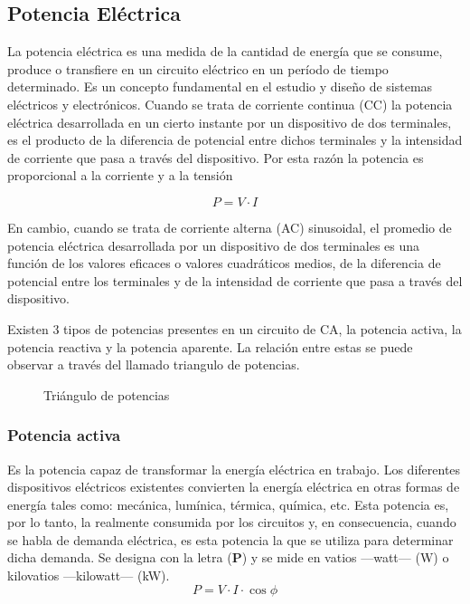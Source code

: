 \subsection{Potencia Eléctrica}
La potencia eléctrica es una medida de la cantidad de energía que se consume, produce o transfiere en un circuito eléctrico en un período de tiempo determinado. Es un concepto fundamental en el estudio y diseño de sistemas eléctricos y electrónicos. 
Cuando se trata de corriente continua (CC) la potencia eléctrica desarrollada en un cierto instante por un dispositivo de dos terminales, es el producto de la diferencia de potencial entre dichos terminales y la intensidad de corriente que pasa a través del dispositivo. Por esta razón la potencia es proporcional a la corriente y a la tensión

\begin{equation}
    P= V \cdot I 
\end{equation}

En cambio, cuando se trata de corriente alterna (AC) sinusoidal, el promedio de potencia eléctrica desarrollada por un dispositivo de dos terminales es una función de los valores eficaces o valores cuadráticos medios, de la diferencia de potencial entre los terminales y de la intensidad de corriente que pasa a través del dispositivo. 


Existen 3 tipos de potencias presentes en un circuito de CA, la potencia activa, la potencia reactiva y la potencia aparente. La relación entre estas se puede observar a través del llamado triangulo de potencias. 

\begin{figure}[h]
    \centering
    
    \caption{Triángulo de potencias}
    \label{fig:triang_pot}
\end{figure}
\subsubsection{Potencia activa}
Es la potencia capaz de transformar la energía eléctrica en trabajo. Los diferentes dispositivos eléctricos existentes convierten la energía eléctrica en otras formas de energía tales como: mecánica, lumínica, térmica, química, etc. Esta potencia es, por lo tanto, la realmente consumida por los circuitos y, en consecuencia, cuando se habla de demanda eléctrica, es esta potencia la que se utiliza para determinar dicha demanda. 
Se designa con la letra (\textbf{P}) y se mide en vatios —watt— (W) o kilovatios —kilowatt— (kW).
\begin{equation}
    P=  V\cdot I\cdot\cos \phi
\end{equation}

